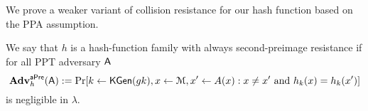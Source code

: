 We prove a weaker variant of collision resistance for our hash function based on the PPA assumption.

\begin{definition}\label{def:hash2}
 We say that $h$ is a hash-function family with always second-preimage resistance if for all PPT adversary $\mathsf{A}$
$$
\mathbf{Adv}_h^{\mathsf{aPre}}(\mathsf{A}) := \Pr[k\gets\mathsf{KGen}(gk), x\gets\mathcal{M}, x'\gets A(x): x\neq x'\text{ and }h_k(x)=h_k(x')]
$$ 
is negligible in $\lambda$.
\end{definition}